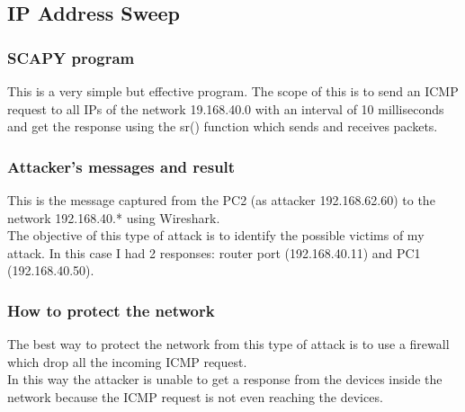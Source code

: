 \subsection{IP Address Sweep}
\subsubsection{SCAPY program}

This is a very simple but effective program. The scope of this is to send an ICMP request to all IPs of the network 19.168.40.0 with an interval of 10 milliseconds and get the response using the sr() function which sends and receives packets.\par

\subsubsection{Attacker’s messages and result}



This is the message captured from the PC2 (as attacker 192.168.62.60) to the network 192.168.40.* using Wireshark.\\
The objective of this type of attack is to identify the possible victims of my attack. In this case I had 2 responses: router port (192.168.40.11) and PC1 (192.168.40.50).\par

\subsubsection{How to protect the network}
The best way to protect the network from this type of attack is to use a firewall which drop all the incoming ICMP request.\\
In this way the attacker is unable to get a response from the devices inside the network because the ICMP request is not even reaching the devices.\par

